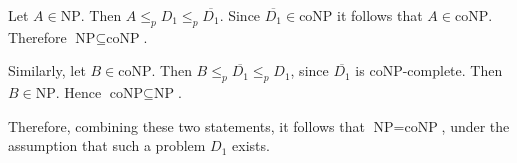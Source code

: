 \documentclass[10pt]{article}
\begin{document}
\begin{enumerate}
\begin{enumerate}
Let \(A \in \text{NP}\). Then \(A \leq_p D_1 \leq_p \overline{D_1}\). Since \(\overline{D_1} \in \text{coNP}\) it follows that \(A \in \text{coNP}\). Therefore \(\text{NP} \subseteq \text{coNP}\).

Similarly, let \(B \in \text{coNP}\). Then \(B \leq_p \overline{D_1} \leq_p D_1\), since \(\overline{D_1}\) is coNP-complete. Then \(B \in \text{NP}\). Hence \(\text{coNP} \subseteq \text{NP}\).

Therefore, combining these two statements, it follows that \(\text{NP} = \text{coNP}\), under the assumption that such a problem \(D_1\) exists.

\end{enumerate}

\end{enumerate}
\end{document}
